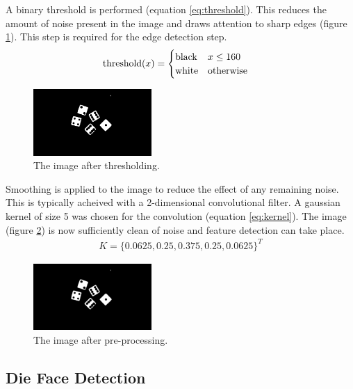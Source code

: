 \documentclass[conference]{IEEEtran}
\begin{document}
A binary threshold is performed (equation \ref{eq:threshold}).
This reduces the amount of noise present in the image and draws attention to sharp edges (figure \ref{fig:threshold}).
This step is required for the edge detection step.
\begin{align}
	\textnormal{threshold}(x) &= \begin{cases}
		\textnormal{black} & x \leq 160 \\
		\textnormal{white} & \textnormal{otherwise}
	\end{cases} \label{eq:threshold}
\end{align}
\begin{figure}[H]
	\centering
	\includegraphics[width=0.4\textwidth]{threshold}
	\caption{The image after thresholding.}
	\label{fig:threshold}
\end{figure}

Smoothing is applied to the image to reduce the effect of any remaining noise.
This is typically acheived with a 2-dimensional convolutional filter.
A gaussian kernel of size 5 was chosen for the convolution (equation \ref{eq:kernel}). 
The image (figure \ref{fig:blurred}) is now sufficiently clean of noise and feature detection can take place.
\begin{align}
	K = \{0.0625, 0.25, 0.375, 0.25, 0.0625\}^T \label{eq:kernel}
\end{align}
\begin{figure}[H]
	\centering
	\includegraphics[width=0.4\textwidth]{blur}
	\caption{The image after pre-processing.}
	\label{fig:blurred}
\end{figure}

\subsection{Die Face Detection}
\end{document}
